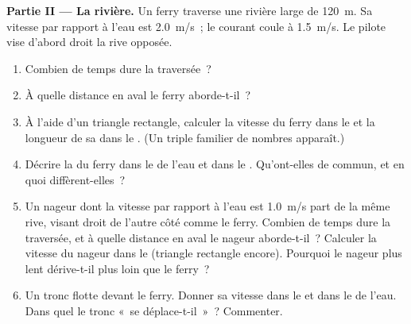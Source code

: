 \begin{problem}
\medskip
\noindent\textbf{Partie II --- La rivière.}
Un ferry traverse une rivière large de \qty{120}{m}. Sa vitesse par
rapport à l'eau est \qty{2.0}{m/s}~; le courant coule à
\qty{1.5}{m/s}. Le pilote vise d'abord droit la rive opposée.
\begin{enumerate}[resume]
  \item Combien de temps dure la traversée~?
  \item À quelle distance en aval le ferry aborde-t-il~?
  \item À l'aide d'un triangle rectangle, calculer la vitesse du ferry
        dans le  et la longueur de sa
         dans le . (Un triple
        familier de nombres apparaît.)
  \item Décrire la  du ferry dans le  de
        l'eau et dans le . Qu'ont-elles de
        commun, et en quoi diffèrent-elles~?
  \item Un nageur dont la vitesse par rapport à l'eau est
        \qty{1.0}{m/s} part de la même rive, visant droit de l'autre
        côté comme le ferry. Combien de temps dure la traversée, et à
        quelle distance en aval le nageur aborde-t-il~? Calculer la
        vitesse du nageur dans le  (triangle
        rectangle encore). Pourquoi le nageur plus lent dérive-t-il
        plus loin que le ferry~?
  \item Un tronc flotte devant le ferry. Donner sa vitesse dans le
         et dans le  de l'eau. Dans
        quel  le tronc «~se déplace-t-il~»~? Commenter.
\end{enumerate}


\end{problem}
